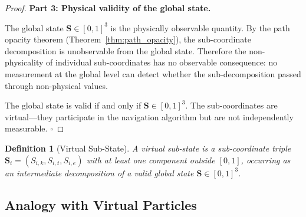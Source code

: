 \documentclass[12pt,twocolumn]{article}
\newtheorem{definition}{Definition}[section]
\begin{document}
\begin{proof}
\textbf{Part 3: Physical validity of the global state.}

The global state $\mathbf{S} \in [0,1]^3$ is the physically observable quantity. By the path opacity theorem (Theorem~\ref{thm:path_opacity}), the sub-coordinate decomposition is unobservable from the global state. Therefore the non-physicality of individual sub-coordinates has no observable consequence: no measurement at the global level can detect whether the sub-decomposition passed through non-physical values.

The global state is valid if and only if $\mathbf{S} \in [0,1]^3$. The sub-coordinates are virtual---they participate in the navigation algorithm but are not independently measurable. $\square$
\end{proof}

\begin{definition}[Virtual Sub-State]
\label{def:virtual}
A \emph{virtual sub-state} is a sub-coordinate triple $\mathbf{S}_i = (S_{i,k}, S_{i,t}, S_{i,e})$ with at least one component outside $[0,1]$, occurring as an intermediate decomposition of a valid global state $\mathbf{S} \in [0,1]^3$.
\end{definition}

\subsection{Analogy with Virtual Particles}
\end{document}
